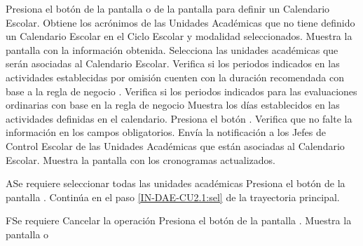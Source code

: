 \begin{UCtrayectoria}
	\UCpaso [\UCactor] Presiona el botón  de la pantalla  o de la pantalla  para definir un Calendario Escolar.
	\UCpaso Obtiene los acrónimos de las Unidades Académicas que no tiene definido un Calendario Escolar en el Ciclo Escolar y modalidad seleccionados. 	
	\UCpaso Muestra la pantalla  con la información obtenida.
	\UCpaso [\UCactor] Selecciona las unidades académicas que serán asociadas al Calendario Escolar.    
	\UCpaso Verifica si los periodos indicados en las actividades establecidas por omisión cuenten con la duración recomendada con base a la regla de negocio . 
	\UCpaso Verifica si los periodos indicados para las evaluaciones ordinarias con base en la regla de negocio     
	\UCpaso \label{IN-DAE-CU2.1:dia}Muestra los días establecidos en las actividades definidas en el calendario.
	\UCpaso [\UCactor] Presiona el botón . 
	\UCpaso Verifica que no falte la información en los  campos obligatorios. 
	\UCpaso Envía la notificación a los Jefes de Control Escolar de las Unidades Académicas que están asociadas al Calendario Escolar.
	\UCpaso Muestra la pantalla  con los cronogramas actualizados.
\end{UCtrayectoria}



\begin{UCtrayectoriaA}{A}{Se requiere seleccionar todas las unidades académicas }
	\UCpaso [\UCactor] 	Presiona el botón  de la pantalla .
	\UCpaso Continúa en el paso \ref{IN-DAE-CU2.1:sel}  de la trayectoria principal.
\end{UCtrayectoriaA}


\begin{UCtrayectoriaA}{F}{Se requiere Cancelar la operación}
	\UCpaso [\UCactor] 	Presiona el botón  de la pantalla .
	\UCpaso Muestra la pantalla  o  
\end{UCtrayectoriaA}

